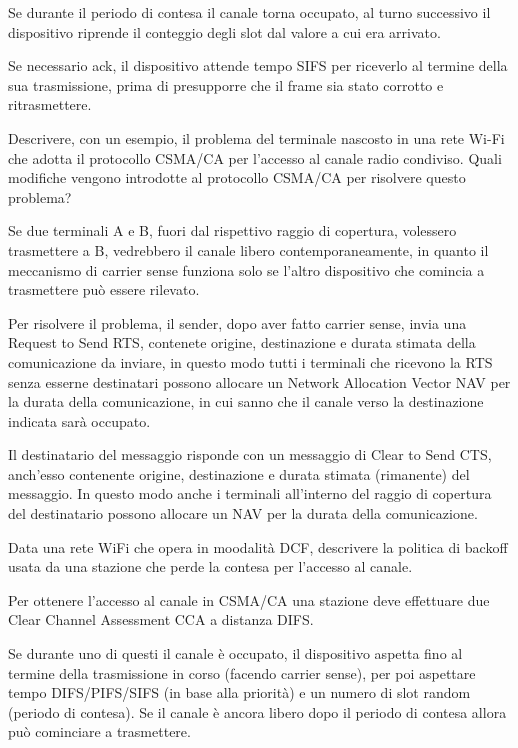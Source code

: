 \begin{questions}
\begin{solution}
        Se durante il periodo di contesa il canale torna occupato, al turno successivo il dispositivo riprende il conteggio degli slot dal valore a cui era arrivato.
        
        Se necessario ack, il dispositivo attende tempo SIFS per riceverlo al termine della sua trasmissione, prima di presupporre che il frame sia stato corrotto e ritrasmettere.
    \end{solution}
    
    \question Descrivere, con un esempio, il problema del terminale nascosto in una rete Wi-Fi che adotta il protocollo CSMA/CA per l'accesso al canale radio condiviso. Quali modifiche vengono introdotte al protocollo CSMA/CA per risolvere questo problema? 
    
    \begin{solution}
        Se due terminali A e B, fuori dal rispettivo raggio di copertura, volessero trasmettere a B, vedrebbero il canale libero contemporaneamente, in quanto il meccanismo di carrier sense funziona solo se l'altro dispositivo che comincia a trasmettere può essere rilevato.
        
        Per risolvere il problema, il sender, dopo aver fatto carrier sense, invia una Request to Send RTS, contenete origine, destinazione e durata stimata della comunicazione da inviare, in questo modo tutti i terminali che ricevono la RTS senza esserne destinatari possono allocare un Network Allocation Vector NAV per la durata della comunicazione, in cui sanno che il canale verso la destinazione indicata sarà occupato.
        
        Il destinatario del messaggio risponde con un messaggio di Clear to Send CTS, anch'esso contenente origine, destinazione e durata stimata (rimanente) del messaggio. In questo modo anche i terminali all'interno del raggio di copertura del destinatario possono allocare un NAV per la durata della comunicazione.
    \end{solution}
    
    \question Data una rete WiFi che opera in moodalità DCF, descrivere la politica di backoff usata da una stazione che perde la contesa per l'accesso al canale.
    
    \begin{solution}
        Per ottenere l'accesso al canale in CSMA/CA una stazione deve effettuare due Clear Channel Assessment CCA a distanza DIFS. 
        
        Se durante uno di questi il canale è occupato, il dispositivo aspetta fino al termine della trasmissione in corso (facendo carrier sense), per poi aspettare tempo DIFS/PIFS/SIFS (in base alla priorità) e un numero di slot random (periodo di contesa). Se il canale è ancora libero dopo il periodo di contesa allora può cominciare a trasmettere.
        

\end{solution}
\end{questions}
